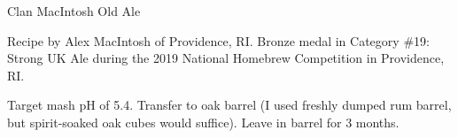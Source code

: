 \stylesection{\styleoldale}

\begin{recipe}{Clan MacIntosh Old Ale}

\begin{aboutblock}
Recipe by Alex MacIntosh of Providence, RI. Bronze medal in Category \#19: Strong
UK Ale during the 2019 National Homebrew Competition in Providence, RI. \sourceaha
\end{aboutblock}


\begin{methodandtiming}
 
\begin{mashsteps}
\end{mashsteps}

\begin{fermentationsteps}
\end{fermentationsteps}

\begin{directions}
Target mash pH of 5.4. Transfer to oak barrel (I used freshly dumped rum barrel, but
spirit-soaked oak cubes would suffice). Leave in barrel for 3 months.
\end{directions}

\end{methodandtiming}

\recipebreak

\begin{ingredientsblock}

\begin{malts}
\end{malts}

\begin{hops}
\end{hops}


\end{ingredientsblock}

\end{recipe}
